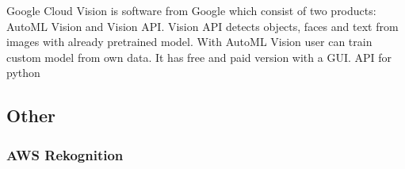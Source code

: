 Google Cloud Vision is software from Google which consist of two products: AutoML Vision and Vision API. Vision API detects objects, faces and text from images with already pretrained model. With AutoML Vision user can train custom model from own data. It has free and paid version with a GUI.\cite{google1}
API for python

\subsection{Other}

\subsubsection{AWS Rekognition}
